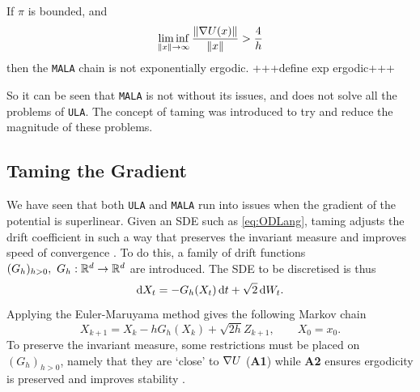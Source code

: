 \begin{theorem}
	If \(\pi\) is bounded, and
		\[\liminf_{\|x\|\to \infty} \frac{\|\nabla U(x)\|}{\|x\|} > \frac{4}{h}\]
	then the \texttt{MALA} chain is not exponentially ergodic. +++define exp ergodic+++
\end{theorem}
So it can be seen that \texttt{MALA} is not without its issues, and does not solve all the problems of \texttt{ULA}. The concept of taming was introduced to try and reduce the magnitude of these problems.

\subsection{Taming the Gradient}
We have seen that both \texttt{ULA} and \texttt{MALA} run into issues when the gradient of the potential is superlinear. Given an SDE such as \eqref{eq:ODLang}, taming adjusts the drift coefficient in such a way that preserves the invariant measure and improves speed of convergence \cite{Brosse18tULA,RT96,Sabanis13}. To do this, a family of drift functions \((G_h)_{h>0}, \ G_h:\mathbb{R}^d \to \mathbb{R}^d\) are introduced. The SDE to be discretised is thus
	\begin{equation*} \mathop{}\!\mathrm{d} X_t = -G_h(X_t)\mathop{}\!\mathrm{d} t +\sqrt{2}\mathop{}\!\mathrm{d} W_t. \end{equation*}
Applying the Euler-Maruyama method gives the following Markov chain
	\[X_{k+1} =X_k-hG_h(X_k)+\sqrt{2h}Z_{k+1},\qquad  X_0=x_0.\]
To preserve the invariant measure, some restrictions must be placed on \((G_h)_{h>0}\), namely that they are `close' to \(\nabla U\) ({\bf A1}) while {\bf A2} ensures ergodicity is preserved and improves stability \cite{Brosse18tULA}. 

